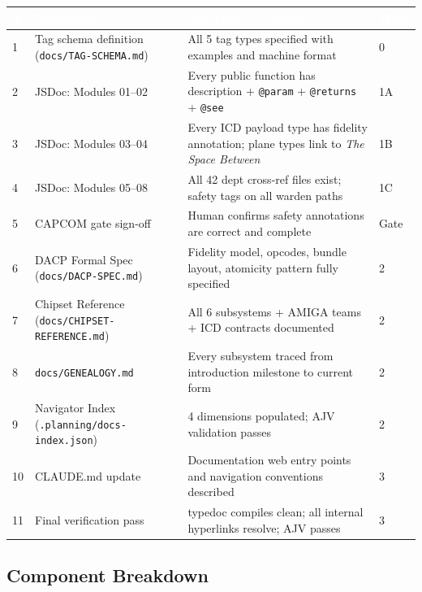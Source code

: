 \documentclass[11pt,letterpaper]{article}
\newcommand{\tableheader}[1]{\textbf{\sffamily\textcolor{white}{#1}}}
\begin{document}
\begin{center}
\begin{tabularx}{\textwidth}{C{0.5cm}L{4cm}L{4cm}C{2cm}}
\toprule
{}
\tableheader{\#} & \tableheader{Deliverable} & \tableheader{Acceptance Criterion} & \tableheader{Wave} \\
 & Tag schema definition (\texttt{docs/TAG-SCHEMA.md}) & All 5 tag types specified with examples and machine format & 0 \\
2 & JSDoc: Modules 01--02 & Every public function has description + \texttt{@param} + \texttt{@returns} + \texttt{@see} & 1A \\
3 & JSDoc: Modules 03--04 & Every ICD payload type has fidelity annotation; plane types link to \textit{The Space Between} & 1B \\
4 & JSDoc: Modules 05--08 & All 42 dept cross-ref files exist; safety tags on all warden paths & 1C \\
5 & CAPCOM gate sign-off & Human confirms safety annotations are correct and complete & Gate \\
6 & DACP Formal Spec (\texttt{docs/DACP-SPEC.md}) & Fidelity model, opcodes, bundle layout, atomicity pattern fully specified & 2 \\
7 & Chipset Reference (\texttt{docs/CHIPSET-REFERENCE.md}) & All 6 subsystems + AMIGA teams + ICD contracts documented & 2 \\
8 & \texttt{docs/GENEALOGY.md} & Every subsystem traced from introduction milestone to current form & 2 \\
9 & Navigator Index (\texttt{.planning/docs-index.json}) & 4 dimensions populated; AJV validation passes & 2 \\
10 & CLAUDE.md update & Documentation web entry points and navigation conventions described & 3 \\
11 & Final verification pass & typedoc compiles clean; all internal hyperlinks resolve; AJV passes & 3 \\
\bottomrule
\end{tabularx}
\end{center}

\subsection{Component Breakdown}
\end{document}
